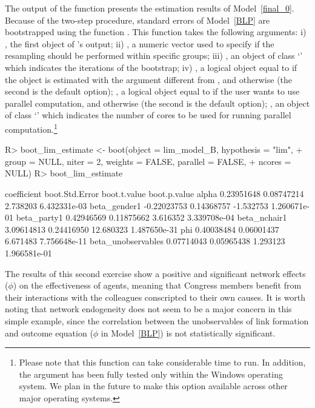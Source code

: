 \documentclass[nojss]{jss}
\begin{document}
The output of the function  presents the
estimation results of Model~\ref{final_0}.  Because of the two-step
procedure, standard errors of Model~\ref{BLP} are bootstrapped using the
function .  This function takes the following arguments: i)
, the first object of 's output; ii) ,
a numeric vector used to specify if the resampling should be performed
within specific groups; iii) , an object of class `' which
indicates the iterations of the bootstrap; iv) , a logical
object equal to  if the object  is estimated with the
argument  different from , and 
otherwise (the second is the default option); , a logical
object equal to  if the user wants to use parallel computation,
and  otherwise (the second is the default option);
, an object of class `' which indicates the number of
cores to be used for running parallel computation.\footnote{Please note that
this function can take considerable time to run.  In addition, the argument
 has been fully tested only within the Windows operating
system.  We plan in the future to make this option available across other
major operating systems.}
%
\begin{CodeChunk}
\begin{CodeInput}
R>  boot_lim_estimate <- boot(object = lim_model_B, hypothesis = "lim",
+    group = NULL, niter = 2, weights = FALSE, parallel = FALSE, 
+    ncores = NULL)
R>  boot_lim_estimate
\end{CodeInput}
\begin{CodeOutput}
                   coefficient boot.Std.Error boot.t.value boot.p.value
alpha               0.23951648     0.08747214     2.738203 6.432331e-03
beta_gender1       -0.22023753     0.14368757    -1.532753 1.260671e-01
beta_party1         0.42946569     0.11875662     3.616352 3.339708e-04
beta_nchair1        3.09614813     0.24416950    12.680323 1.487650e-31
phi                 0.40038484     0.06001437     6.671483 7.756648e-11
beta_unobservables  0.07714043     0.05965438     1.293123 1.966581e-01
\end{CodeOutput}
\end{CodeChunk}
%
The results of this second exercise show a positive and significant network
effects ($\phi$) on the effectiveness of agents, meaning that Congress
members benefit from their interactions with the colleagues conscripted to
their own causes.  It is worth noting that network endogeneity does not seem
to be a major concern in this simple example, since the correlation between
the unobservables of link formation and outcome equation ($\phi$ in Model~\ref{BLP})
is not statistically significant.
\end{document}
